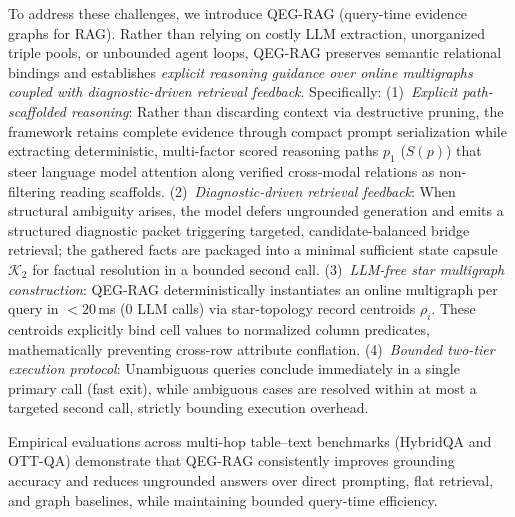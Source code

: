 \documentclass[runningheads]{llncs}
\begin{document}
To address these challenges, we introduce QEG-RAG (query-time evidence graphs for RAG). Rather than relying on costly LLM extraction, unorganized triple pools, or unbounded agent loops, QEG-RAG preserves semantic relational bindings and establishes \emph{explicit reasoning guidance over online multigraphs coupled with diagnostic-driven retrieval feedback}. Specifically:
(1)~\emph{Explicit path-scaffolded reasoning}: Rather than discarding context via destructive pruning, the framework retains complete evidence through compact prompt serialization while extracting deterministic, multi-factor scored reasoning paths $p_1$ ($S(p)$) that steer language model attention along verified cross-modal relations as non-filtering reading scaffolds.
(2)~\emph{Diagnostic-driven retrieval feedback}: When structural ambiguity arises, the model defers ungrounded generation and emits a structured diagnostic packet triggering targeted, candidate-balanced bridge retrieval; the gathered facts are packaged into a minimal sufficient state capsule $\mathcal{K}_2$ for factual resolution in a bounded second call.
(3)~\emph{LLM-free star multigraph construction}: QEG-RAG deterministically instantiates an online multigraph per query in $<20$\,ms (0 LLM calls) via star-topology record centroids $\rho_i$. These centroids explicitly bind cell values to normalized column predicates, mathematically preventing cross-row attribute conflation.
(4)~\emph{Bounded two-tier execution protocol}: Unambiguous queries conclude immediately in a single primary call (fast exit), while ambiguous cases are resolved within at most a targeted second call, strictly bounding execution overhead.

Empirical evaluations across multi-hop table--text benchmarks (HybridQA and OTT-QA) demonstrate that QEG-RAG consistently improves grounding accuracy and reduces ungrounded answers over direct prompting, flat retrieval, and graph baselines, while maintaining bounded query-time efficiency.
\end{document}
